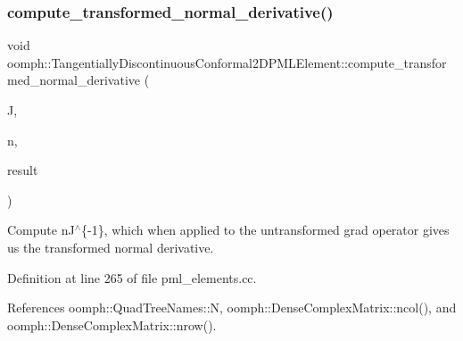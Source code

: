 \subsubsection{\texorpdfstring{compute\+\_\+transformed\+\_\+normal\+\_\+derivative()}{compute\_transformed\_normal\_derivative()}}
{\footnotesize\ttfamily void oomph\+::\+Tangentially\+Discontinuous\+Conformal2\+D\+P\+M\+L\+Element\+::compute\+\_\+transformed\+\_\+normal\+\_\+derivative (\begin{DoxyParamCaption}\item[{const \hyperlink{classoomph_1_1DenseComplexMatrix}{Dense\+Complex\+Matrix} \&}]{J,  }\item[{const \hyperlink{classoomph_1_1Vector}{Vector}$<$ double $>$ \&}]{n,  }\item[{\hyperlink{classoomph_1_1Vector}{Vector}$<$ std\+::complex$<$ double $>$ $>$ \&}]{result }\end{DoxyParamCaption})}



Compute n\textquotesingle{}J$^\wedge$\{-\/1\}, which when applied to the untransformed grad operator gives us the transformed normal derivative. 



Definition at line 265 of file pml\+\_\+elements.\+cc.



References oomph\+::\+Quad\+Tree\+Names\+::N, oomph\+::\+Dense\+Complex\+Matrix\+::ncol(), and oomph\+::\+Dense\+Complex\+Matrix\+::nrow().

\mbox{\label{classoomph_1_1TangentiallyDiscontinuousConformal2DPMLElement_a9a2bcca5fb44204c9bc7cb7b2312a4de}} 
